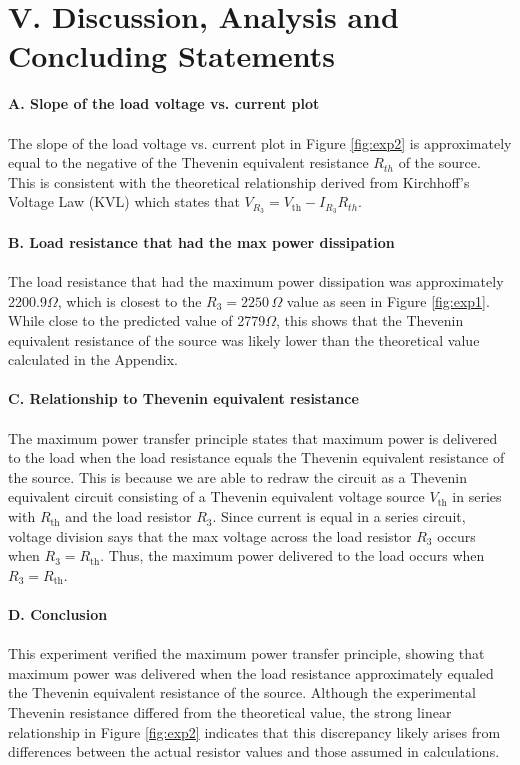 \documentclass[12pt]{article}
\begin{document}
\section*{V. Discussion, Analysis and Concluding Statements}
\textbf{A. Slope of the load voltage vs. current plot}\\\\
The slope of the load voltage vs. current plot in Figure \ref{fig:exp2} is approximately equal to the negative of the Thevenin equivalent resistance $R_{th}$ of the source. This is consistent with the theoretical relationship derived from Kirchhoff's Voltage Law (KVL) which states that $V_{R_3} = V_\text{th} - I_{R_3} R_{th}$.\\\\
\textbf{B. Load resistance that had the max power dissipation}\\\\
The load resistance that had the maximum power dissipation was approximately 2200.9$\Omega$, which is closest to the $R_3=2250\,\Omega$ value as seen in Figure \ref{fig:exp1}. While close to the predicted value of 2779$\Omega$, this shows that the Thevenin equivalent resistance of the source was likely lower than the theoretical value calculated in the Appendix.\\\\
\textbf{C. Relationship to Thevenin equivalent resistance}\\\\
The maximum power transfer principle states that maximum power is delivered to the load when the load resistance equals the Thevenin equivalent resistance of the source. This is because we are able to redraw the circuit as a Thevenin equivalent circuit consisting of a Thevenin equivalent voltage source $V_\text{th}$ in series with $R_\text{th}$ and the load resistor $R_3$. Since current is equal in a series circuit, voltage division says that the max voltage across the load resistor $R_3$ occurs when $R_3 = R_\text{th}$. Thus, the maximum power delivered to the load occurs when $R_3 = R_\text{th}$.\\\\
\textbf{D. Conclusion}\\\\
This experiment verified the maximum power transfer principle, showing that maximum power was delivered when the load resistance approximately equaled the Thevenin equivalent resistance of the source. Although the experimental Thevenin resistance differed from the theoretical value, the strong linear relationship in Figure \ref{fig:exp2} indicates that this discrepancy likely arises from differences between the actual resistor values and those assumed in calculations.
\newpage
\end{document}

